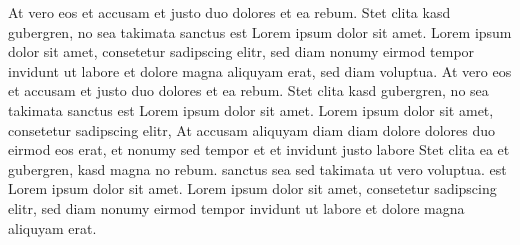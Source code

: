 At vero eos et accusam et justo duo dolores et ea rebum. Stet clita kasd
gubergren, no sea takimata sanctus est Lorem ipsum dolor sit amet. Lorem ipsum
dolor sit amet, consetetur sadipscing elitr,  sed diam nonumy eirmod tempor
invidunt ut labore et dolore magna aliquyam erat, sed diam voluptua. At vero
eos et accusam et justo duo dolores et ea rebum. Stet clita kasd gubergren, no
sea takimata sanctus est Lorem ipsum dolor sit amet. Lorem ipsum dolor sit
amet, consetetur sadipscing elitr,  At accusam aliquyam diam diam dolore
dolores duo eirmod eos erat, et nonumy sed tempor et et invidunt justo labore
Stet clita ea et gubergren, kasd magna no rebum. sanctus sea sed takimata ut
vero voluptua. est Lorem ipsum dolor sit amet. Lorem ipsum dolor sit amet,
consetetur sadipscing elitr,  sed diam nonumy eirmod tempor invidunt ut labore
et dolore magna aliquyam erat. 
